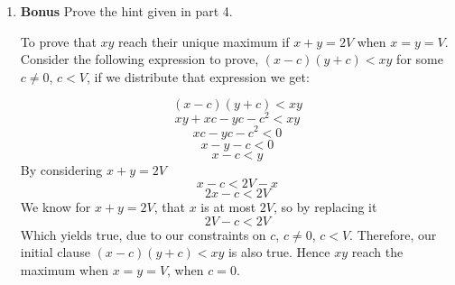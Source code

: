 \documentclass[11pt]{article}
\def\question#1{\red{#1}}
\def\soln#1{\par\blu{#1}} %
\def\blu#1{{\color{blu}#1}}
\def\red#1{{\color{red}#1}}
\begin{document}
\begin{enumerate}
\item \textbf{Bonus} \question{Prove the hint given in part 4.}
\soln{
   To prove that $xy$ reach their unique maximum if $x+y=2V$ when $x=y=V$. Consider the following 
   expression to prove, $(x-c)(y+c) < xy$ for some $c \neq 0$, $c < V$, if we distribute that expression 
   we get: 
   \begin{center}
      \[(x-c)(y+c) < xy\]
      \[xy + xc - yc - c^2 < xy\]
      \[xc - yc - c^2 < 0\]
      \[x - y - c < 0\]
      \[x - c < y\]
      By considering $x+y=2V$
      \[x - c < 2V -x\]
      \[2x - c < 2V \]
      We know for $x+y=2V$, that $x$ is at most $2V$, so by replacing it
      \[2V - c < 2V \]
      Which yields true, due to our constraints on $c$, $c \neq 0$, $c < V$. Therefore, our initial 
      clause $(x-c)(y+c) < xy$ is also true. Hence $xy$ reach the maximum when $x = y = V$, when 
      $c=0$.
   \end{center}
}
\end{enumerate}
\end{document}
